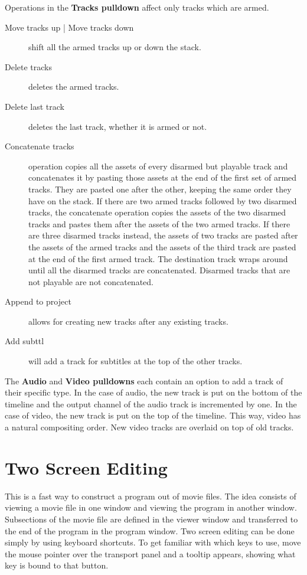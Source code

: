 Operations in the \textbf{Tracks pulldown} affect only tracks which are armed.

\begin{description}
    \item[Move tracks up | Move tracks down] shift all the armed tracks up or down the stack.
    \item[Delete tracks] deletes the armed tracks.
    \item[Delete last track] deletes the last track, whether it is armed or not.
    \item[Concatenate tracks] operation copies all the assets of every disarmed but playable track and concatenates it by pasting those assets at the end of the first set of armed tracks. They are pasted one after the other, keeping the same order they have on the stack. If there are two armed tracks followed by two disarmed tracks, the concatenate operation copies the assets of the two disarmed tracks and pastes them after the assets of the two armed tracks. If there are three disarmed tracks instead, the assets of two tracks are pasted after the assets of the armed tracks and the assets of the third track are pasted at the end of the first armed track. The destination track wraps around until all the disarmed tracks are concatenated. Disarmed tracks that are not playable are not concatenated.
    \item[Append to project] allows for creating new tracks after any existing tracks.
    \item[Add subttl] will add a track for subtitles at the top of the other tracks.
\end{description}

The \textbf{Audio} and \textbf{Video pulldowns} each contain an option to add a track of their specific type. In the case of audio, the new track is put on the bottom of the timeline and the output channel of the audio track is incremented by one. In the case of video, the new track is put on the top of the timeline. This way, video has a natural compositing order. New video tracks are overlaid on top of old tracks.

\section{Two Screen Editing}%
\label{sec:two_screen_editing}

This is a fast way to construct a program out of movie files. The idea consists of viewing a movie file in one window and viewing the program in another window. Subsections of the movie file are defined in the viewer window and transferred to the end of the program in the program window.  Two screen editing can be done simply by using keyboard shortcuts.  To get familiar with which keys to use, move the mouse pointer over the transport panel and a tooltip appears, showing what key is bound to that button.

